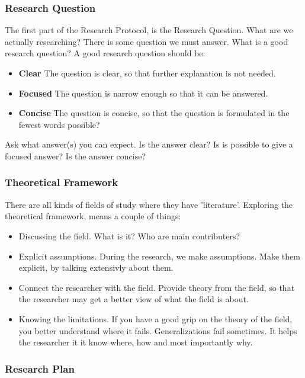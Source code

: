 \documentclass[10pt]{report}
\begin{document}
\subsubsection{Research Question}

The first part of the Research Protocol, is the Research Question. What are we actually researching? There is some question we must answer. What is a good research question? A good research question should be:

\begin{itemize}
	\item \textbf{Clear} The question is clear, so that further explanation is not needed.
	\item \textbf{Focused} The question is narrow enough so that it can be answered.
	\item \textbf{Concise} The question is concise, so that the question is formulated in the fewest words possible?
\end{itemize}

\noindent Ask what answer(s) you can expect. Is the answer clear? Is is possible to give a focused answer? Is the answer concise?

\subsubsection{Theoretical Framework}

There are all kinds of fields of study where they have 'literature'. Exploring the theoretical framework, means a couple of things:

\begin{itemize}
	\item Discussing the field. What is it? Who are main contributers?
	\item Explicit assumptions. During the research, we make assumptions. Make them explicit, by talking extensivly about them.
	\item Connect the researcher with the field. Provide theory from the field, so that the researcher may get a better view of what the field is about.
	\item Knowing the limitations. If you have a good grip on the theory of the field, you better understand where it fails. Generalizations fail sometimes. It helps the researcher it it know where, how and most importantly why.
\end{itemize}

\subsubsection{Research Plan}
\end{document}
